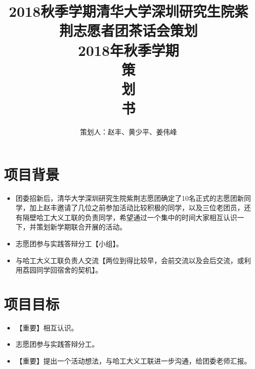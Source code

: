\documentclass[12pt]{ctexart}
\begin{document}
\title{
    \vspace{-0.5in}
    \textmd{\textbf{\huge{2018秋季学期清华大学深圳研究生院紫荆志愿者团\quad 茶话会策划}}}\\
    \normalsize\vspace{0.1in}\Large{2018年秋季学期}\\
    \vspace{1in}
     \textbf{\huge{策}}\\
    \vspace{1in}
     \textbf{\huge{划}}\\
    \vspace{1in}
     \textbf{\huge{书}}\\
    \vspace{1in}
}
\author{策划人：赵丰、黄少平、姜伟峰}
\maketitle
\thispagestyle{empty}
\pagebreak
\pagestyle{runningpage}

\section{项目背景}
\begin{itemize}
\item 团委招新后，清华大学深圳研究生院紫荆志愿团确定了10名正式的志愿团新同学，加上赵丰邀请了几位之前参加活动比较积极的同学，以及三位老团员，还有隔壁哈工大义工联的负责同学，希望通过一个集中的时间大家相互认识一下，并策划新学期联合开展的活动。
\item 志愿团参与实践答辩分工【小组】。
\item 与哈工大义工联负责人交流【两位到得比较早，会前交流以及会后交流，或利用荔园同学回宿舍的契机】。
\end{itemize}
\section{项目目标}
\begin{itemize}
\item 【重要】相互认识。
\item 志愿团参与实践答辩分工。
\item 【重要】提出一个活动想法，与哈工大义工联进一步沟通，给团委老师汇报。
\end{itemize}
\end{document}
